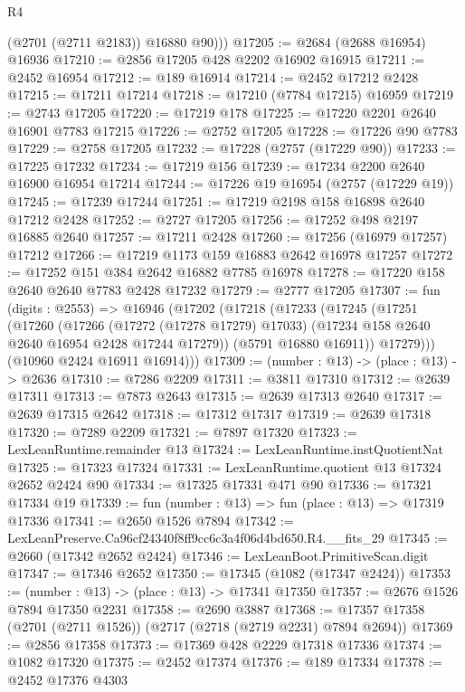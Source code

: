 \begin{lexlean}{R4}
\begin{coremodule}
          (@2701 (@2711 @2183))
          @16880
          @90)))
@17205 := @2684 (@2688 @16954) @16936
@17210 := @2856 @17205 @428 @2202 @16902 @16915
@17211 := @2452 @16954
@17212 := @189 @16914
@17214 := @2452 @17212 @2428
@17215 := @17211 @17214
@17218 := @17210 (@7784 @17215) @16959
@17219 := @2743 @17205
@17220 := @17219 @178
@17225 := @17220 @2201 @2640 @16901 @7783 @17215
@17226 := @2752 @17205
@17228 := @17226 @90 @7783
@17229 := @2758 @17205
@17232 := @17228 (@2757 (@17229 @90))
@17233 := @17225 @17232
@17234 := @17219 @156
@17239 := @17234 @2200 @2640 @16900 @16954 @17214
@17244 := @17226 @19 @16954 (@2757 (@17229 @19))
@17245 := @17239 @17244
@17251 := @17219 @2198 @158 @16898 @2640 @17212 @2428
@17252 := @2727 @17205
@17256 := @17252 @498 @2197 @16885 @2640
@17257 := @17211 @2428
@17260 := @17256 (@16979 @17257) @17212
@17266 := @17219 @1173 @159 @16883 @2642 @16978 @17257
@17272 := @17252 @151 @384 @2642 @16882 @7785 @16978
@17278 := @17220 @158 @2640 @2640 @7783 @2428 @17232
@17279 := @2777 @17205
@17307 := fun (digits : @2553) =>
  @16946
    (@17202
      (@17218
        (@17233
          (@17245
            (@17251
              (@17260
                (@17266
                  (@17272 (@17278 @17279) @17033)
                  (@17234 @158 @2640 @2640 @16954 @2428 @17244 @17279))
                (@5791 @16880 @16911))
              @17279)))
        (@10960 @2424 @16911 @16914)))
@17309 := (number : @13) -> (place : @13) -> @2636
@17310 := @7286 @2209
@17311 := @3811 @17310
@17312 := @2639 @17311
@17313 := @7873 @2643
@17315 := @2639 @17313 @2640
@17317 := @2639 @17315 @2642
@17318 := @17312 @17317
@17319 := @2639 @17318
@17320 := @7289 @2209
@17321 := @7897 @17320
@17323 := LexLeanRuntime.remainder @13
@17324 := LexLeanRuntime.instQuotientNat
@17325 := @17323 @17324
@17331 := LexLeanRuntime.quotient @13 @17324 @2652 @2424 @90
@17334 := @17325 @17331 @471 @90
@17336 := @17321 @17334 @19
@17339 := fun (number : @13) => fun (place : @13) => @17319 @17336
@17341 := @2650 @1526 @7894
@17342 := LexLeanPreserve.Ca96cf24340f8ff9cc6c3a4f06d4bd650.R4.__fits_29
@17345 := @2660 (@17342 @2652 @2424)
@17346 := LexLeanBoot.PrimitiveScan.digit
@17347 := @17346 @2652
@17350 := @17345 (@1082 (@17347 @2424))
@17353 := (number : @13) -> (place : @13) -> @17341 @17350
@17357 := @2676 @1526 @7894 @17350 @2231
@17358 := @2690 @3887
@17368 := @17357 @17358 (@2701 (@2711 @1526)) (@2717 (@2718 (@2719 @2231) @7894 @2694))
@17369 := @2856 @17358
@17373 := @17369 @428 @2229 @17318 @17336
@17374 := @1082 @17320
@17375 := @2452 @17374
@17376 := @189 @17334
@17378 := @2452 @17376 @4303

\end{coremodule}
\end{lexlean}
